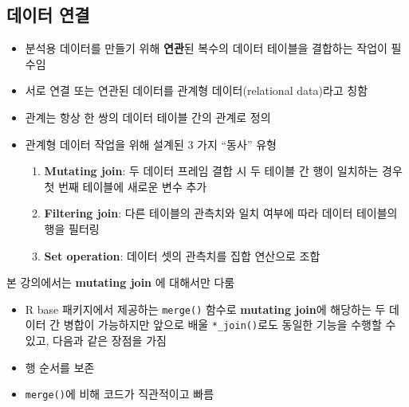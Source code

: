 \documentclass[
  11pt,
]{krantz}
\makeatletter
\providecommand{\tightlist}{%
  \setlength{\itemsep}{0pt}\setlength{\parskip}{0pt}}
\newenvironment{kframe}{%
\medskip{}
\setlength{\fboxsep}{.8em}
 \def\at@end@of@kframe{}%
 \ifinner\ifhmode%
  \def\at@end@of@kframe{\end{minipage}}%
  \begin{minipage}{\columnwidth}%
 \fi\fi%
 \def\FrameCommand##1{\hskip\@totalleftmargin \hskip-\fboxsep
 \colorbox{shadecolor}{##1}\hskip-\fboxsep
     \hskip-\linewidth \hskip-\@totalleftmargin \hskip\columnwidth}%
 \MakeFramed {\advance\hsize-\width
   \@totalleftmargin\z@ \linewidth\hsize
   \@setminipage}}%
 {\par\unskip\endMakeFramed%
 \at@end@of@kframe}
\newenvironment{rmdblock}[1]
  {
  \begin{itemize}
  \renewcommand{\labelitemi}{
    \raisebox{-.7\height}[0pt][0pt]{
      {\setkeys{Gin}{width=3em,keepaspectratio}\texttt{[image: images/\#1]}}
    }
  }
  \setlength{\fboxsep}{1em}
  \begin{kframe}
  \item
  }
  {
  \end{kframe}
  \end{itemize}
  }
\newenvironment{rmdnote}
  {\begin{rmdblock}{note}}
  {\end{rmdblock}}
\renewenvironment{quote}{\begin{kframe}}{\end{kframe}}
\makeatother
\begin{document}
\normalsize

\hypertarget{dplyr-join}{%
\subsection{데이터 연결}\label{dplyr-join}}

\begin{itemize}
\item
  분석용 데이터를 만들기 위해 \textbf{연관}된 복수의 데이터 테이블을 결합하는 작업이 필수임
\item
  서로 연결 또는 연관된 데이터를 관계형 데이터(relational data)라고 칭함
\item
  관계는 항상 한 쌍의 데이터 테이블 간의 관계로 정의
\item
  관계형 데이터 작업을 위해 설계된 3 가지 ``동사'' 유형

  \begin{enumerate}
  \def\labelenumi{\alph{enumi}.}
  \tightlist
  \item
    \textbf{Mutating join}: 두 데이터 프레임 결합 시 두 테이블 간 행이 일치하는 경우 첫 번째 테이블에 새로운 변수 추가
  \item
    \textbf{Filtering join}: 다른 테이블의 관측치와 일치 여부에 따라 데이터 테이블의 행을 필터링
  \item
    \textbf{Set operation}: 데이터 셋의 관측치를 집합 연산으로 조합
  \end{enumerate}
\end{itemize}

\footnotesize

\begin{rmdnote}
\begin{rmdnote}

본 강의에서는 \textbf{mutating join} 에 대해서만 다룸

\end{rmdnote}
\end{rmdnote}

\normalsize

\begin{itemize}
\tightlist
\item
  R base 패키지에서 제공하는 \texttt{merge()} 함수로 \textbf{mutating join}에 해당하는 두 데이터 간 병합이 가능하지만 앞으로 배울 \texttt{*\_join()}로도 동일한 기능을 수행할 수 있고, 다음과 같은 장점을 가짐
\end{itemize}

\begin{quote}
\begin{itemize}
\tightlist
\item
  행 순서를 보존
\item
  \texttt{merge()}에 비해 코드가 직관적이고 빠름
\end{itemize}
\end{quote}
\end{document}
